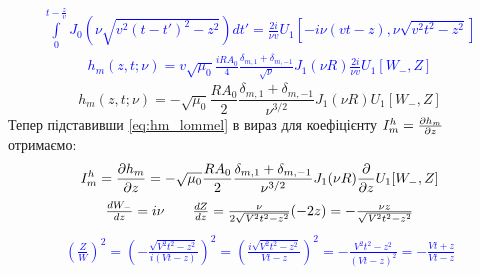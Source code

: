 %
\textcolor{blue} { \begin{equation*} \begin{aligned}
\int \limits_{0}^{t - \frac{z}{\mathit{v}}} 
J_0 \left( \nu \sqrt{\mathit{v}^2 (t-t')^2 - z^2} 
\right) dt' = \frac{2i}{\nu \mathit{v}} U_1 
\left[ -i \nu (\mathit{v}t-z), \nu \sqrt{\mathit{v}^2t^2-z^2} \right]
\end{aligned} \end{equation*} }
%
\textcolor{blue} { \begin{equation*} \begin{aligned}
h_m (z, t; \nu) = \mathit{v} \sqrt{\mu_0} \frac{iR A_0}{4} 
\frac{\delta_{m,1} + \delta_{m,-1}} {\sqrt{\nu}} J_1 (\nu R) 
\frac{2i}{\nu \mathit{v}} U_1 \left[ W_-, Z \right]
\end{aligned} \end{equation*} }
%
\begin{equation} \label{eq:hm_lommel}
h_m (z, t; \nu) = - \sqrt{\mu_0} \frac{R A_0}{2} 
\frac{\delta_{m,1} + \delta_{m,-1}}
{\nu^{3/2}} J_1 (\nu R) U_1 \left[ W_-, Z \right]
\end{equation}
%
Тепер підставивши \eqref{eq:hm_lommel} в вираз для коефіцієнту
$ I_{m}^{h} = \frac{\partial h_m}{\partial z} $ отримаємо:
%
\textcolor{blue} { \begin{equation*} \begin{aligned}
I_{m}^{h} = \frac{\partial h_m}{\partial z} = 
- \sqrt{\mu_0} \frac{R A_0}{2} 
\frac{\delta_{m,1} + \delta_{m,-1}}
{\nu^{3/2}} J_1 (\nu R) \frac{\partial }{\partial z} U_1 [ W_-, Z ]
\end{aligned} \end{equation*} }
%
\textcolor{blue} { \begin{equation*} \begin{aligned}
\begin{array}{lcr}
\frac{d W_-}{d z} = i \nu & &
\frac{d Z}{d z} = \frac{\nu}{2 \sqrt{\mathit{V}^2 t^2 - z^2}} (-2z) = 
- \frac{\nu z}{\sqrt{\mathit{V}^2 t^2 - z^2}} \\
\end{array}
\end{aligned} \end{equation*} }
%
\textcolor{blue} { \begin{equation*} \begin{aligned}
\left( \frac{Z}{W} \right)^2 = 
\left( - \frac{ \sqrt{\mathit{V}^2 t^2-z^2}}{i(\mathit{V} t-z)} \right)^2 =
\left( \frac{ i \sqrt{\mathit{V}^2 t^2-z^2}}{\mathit{V}t-z} \right)^2 =
- \frac{\mathit{V}^2 t^2-z^2}{(\mathit{V} t-z)^2} = 
- \frac{\mathit{V}t+z}{\mathit{V}t-z}
\end{aligned} \end{equation*} }
